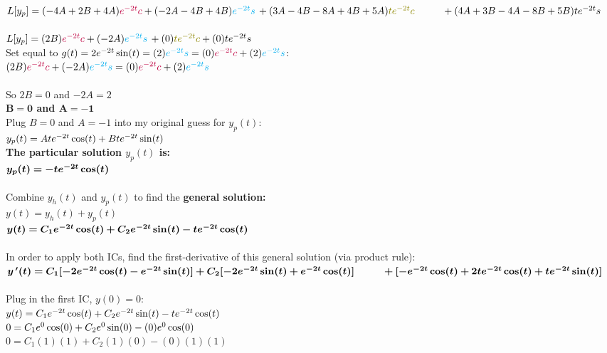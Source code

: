 \documentclass{article}
\begin{document}
\begin{enumerate}
$L[y_p] = (-4A + 2B + 4A)\textcolor{purple}{e\sp{-2t}c} + (-2A-4B+4B)\textcolor{cyan}{e\sp{-2t}s} \,+ (3A-4B-8A+4B+5A)\textcolor{olive}{te\sp{-2t}c} \\\phantom{0.0001}+ (4A+3B-4A-8B+5B)te\sp{-2t}s$\\\\
$L[y_p] = (2B)\textcolor{purple}{e\sp{-2t}c} + (-2A)\textcolor{cyan}{e\sp{-2t}s} \,+ (0)\textcolor{olive}{te\sp{-2t}c} + (0)te\sp{-2t}s$\\
Set equal to $g(t) = 2e\sp{-2t}\sin(t) = (2)\textcolor{cyan}{e\sp{-2t}s} = (0)\textcolor{purple}{e\sp{-2t}c} + (2)\textcolor{cyan}{e\sp{-2t}s}$:\\
$(2B)\textcolor{purple}{e\sp{-2t}c} + (-2A)\textcolor{cyan}{e\sp{-2t}s} = (0)\textcolor{purple}{e\sp{-2t}c} + (2)\textcolor{cyan}{e\sp{-2t}s}$\\\\
So $2B = 0$ and $-2A = 2$\\
\textbf{$\bm{B = 0}$ and $\bm{A = -1}$}\\
Plug $B=0$ and $A=-1$ into my original guess for $y_p(t)$:\\
$y_p(t) = Ate\sp{-2t}\cos(t) + Bte\sp{-2t}\sin(t)$\\
\textbf{The particular solution $y_p(t)$ is:}\\
$\bm{y_p(t) = -te\sp{-2t}\cos(t)}$\\\\
Combine $y_h(t)$ and $y_p(t)$ to find the \textbf{general solution:}\\
$y(t) = y_h(t) + y_p(t)$\\
$\bm{y(t) = C_1e\sp{-2t}\cos(t) + C_2e\sp{-2t}\sin(t) -te\sp{-2t}\cos(t)}$\\\\
In order to apply both ICs, find the first-derivative of this general solution (via product rule):\\
$\bm{y\,\sp\prime(t) = C_1[-2e\sp{-2t}\cos(t) - e\sp{-2t}\sin(t)] + C_2[-2e\sp{-2t}\sin(t) + e\sp{-2t}\cos(t)]} \\ \phantom{0.0001}\bm{+ [-e\sp{-2t}\cos(t) + 2te\sp{-2t}\cos(t) + te\sp{-2t}\sin(t)]}$\\\\
Plug in the first IC, $y(0)=0$:\\
$y(t) = C_1e\sp{-2t}\cos(t) + C_2e\sp{-2t}\sin(t) -te\sp{-2t}\cos(t)$\\
$0 = C_1e\sp{0}\cos(0) + C_2e\sp{0}\sin(0) -(0)e\sp{0}\cos(0)$\\
$0 = C_1(1)(1) + C_2(1)(0) -(0)(1)(1)$\\

\end{enumerate}
\end{document}
